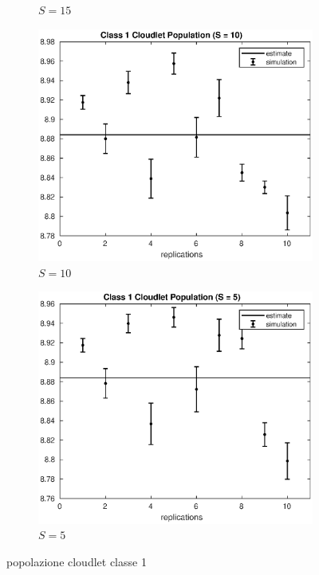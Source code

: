 \begin{figure}[!h]
\begin{subfigure}[t]{0.49\textwidth}
\caption{$S = 15$}
\label{15_n1clet}
\end{subfigure}
%
\begin{subfigure}[t]{0.49\textwidth}
\includegraphics[width=\textwidth]{figures/simul/10_500K_n1clet}
\caption{$S = 10$}
\label{10_n1clet}
\end{subfigure}
%
\begin{subfigure}[t]{0.49\textwidth}
\includegraphics[width=\textwidth]{figures/simul/5_500K_n1clet}
\caption{$S = 5$}
\label{5_n1clet}
\end{subfigure}
%
\caption{popolazione cloudlet classe 1}
\label{plot:n1clet}
\end{figure}
%
%

